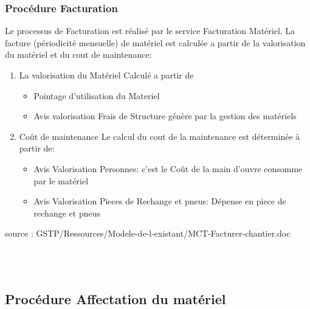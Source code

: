 \subsubsection{Procédure Facturation}
	Le processus de Facturation est réalisé par le service Facturation Matériel. La facture (périodicité mensuelle) de matériel est calculée a partir de 
	la valorisation du matériel et du cout de maintenance:\\
\begin {enumerate}
	\item La valorisation du Matériel
		Calculé a partir de \\
		\begin{itemize}
			\item Pointage d'utilisation du Materiel\\
			\item Avis valorisation Frais de Structure génère par la gestion des matériels	\\
		\end{itemize}	
	\item Coût de maintenance
		Le calcul du cout de la maintenance est déterminée à partir de:\\
		\begin{itemize}
			\item Avis Valorisation Personnes: c'est le Coût de la main d'ouvre  consomme par le matériel\\
			\item Avis Valorisation Pieces de Rechange et pneus: Dépense en piece de rechange et pneus \\
		\end{itemize}

\end{enumerate}

source : GSTP/Ressources/Modele-de-l-existant/MCT-Facturer-chantier.doc

\hfill\\
\hfill\\
\subsection{Procédure Affectation du matériel}

